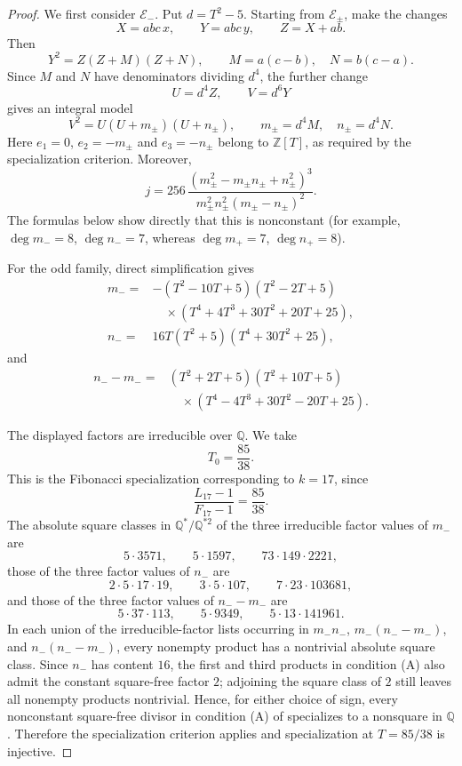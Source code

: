 \documentclass[11pt]{amsart}
\theoremstyle{remark}
\newcommand{\Q}{\mathbb{Q}}
\newcommand{\Z}{\mathbb{Z}}
\begin{document}
\begin{proof}
We first consider $\mathcal E_-$.  Put $d=T^2-5$.  Starting from
$\mathcal E_\pm$, make the changes
\[
 X=abc\,x,\qquad Y=abc\,y,\qquad Z=X+ab.
\]
Then
\[
 Y^2=Z(Z+M)(Z+N),\qquad
 M=a(c-b),\quad N=b(c-a).
\]
Since $M$ and $N$ have denominators dividing $d^4$, the further change
\[
 U=d^4Z,\qquad V=d^6Y
\]
gives an integral model
\[
 V^2=U(U+m_\pm)(U+n_\pm),\qquad
 m_\pm=d^4M,\quad n_\pm=d^4N.
\]
Here $e_1=0$, $e_2=-m_\pm$ and $e_3=-n_\pm$ belong to
$\Z[T]$, as required by the specialization criterion.  Moreover,
\[
 j=256\,\frac{(m_\pm^2-m_\pm n_\pm+n_\pm^2)^3}
 {m_\pm^2n_\pm^2(m_\pm-n_\pm)^2}.
\]
The formulas below show directly that this is nonconstant (for example,
$\deg m_-=8$, $\deg n_-=7$, whereas $\deg m_+=7$, $\deg n_+=8$).

For the odd family, direct simplification gives
\begin{align*}
m_-={}&-(T^2-10T+5)(T^2-2T+5)\\
&\quad{}\times(T^4+4T^3+30T^2+20T+25),\\
n_-={}&16T(T^2+5)(T^4+30T^2+25),
\end{align*}
and
\begin{align*}
n_--m_-={}&(T^2+2T+5)(T^2+10T+5)\\
&\quad{}\times(T^4-4T^3+30T^2-20T+25).
\end{align*}

The displayed factors are irreducible over $\Q$.
We take
\[
 T_0=\frac{85}{38}.
\]
This is the Fibonacci specialization corresponding to $k=17$, since
\[
 \frac{L_{17}-1}{F_{17}-1}=\frac{85}{38}.
\]
The absolute square classes in $\Q^*/\Q^{*2}$ of the three irreducible
factor values of $m_-$ are
\[
 5\cdot3571,\qquad 5\cdot1597,\qquad 73\cdot149\cdot2221,
\]
those of the three factor values of $n_-$ are
\[
 2\cdot5\cdot17\cdot19,\qquad
 3\cdot5\cdot107,\qquad
 7\cdot23\cdot103681,
\]
and those of the three factor values of $n_--m_-$ are
\[
 5\cdot37\cdot113,\qquad
 5\cdot9349,\qquad
 5\cdot13\cdot141961.
\]
In each union of the
irreducible-factor lists occurring in 
$m_-n_-$, $m_-(n_--m_-)$, and $n_-(n_--m_-)$, 
every nonempty product has a nontrivial absolute square class.  Since
$n_-$ has content $16$, the first and third products in condition (A)
also admit the constant square-free factor $2$; adjoining the square
class of $2$ still leaves all nonempty products nontrivial.  Hence, for
either choice of sign, every nonconstant square-free divisor in
condition (A) of \cite{GusicTadic} specializes to a nonsquare in $\Q$.
Therefore the specialization criterion applies and specialization
at $T=85/38$ is injective.


\end{proof}
\end{document}
